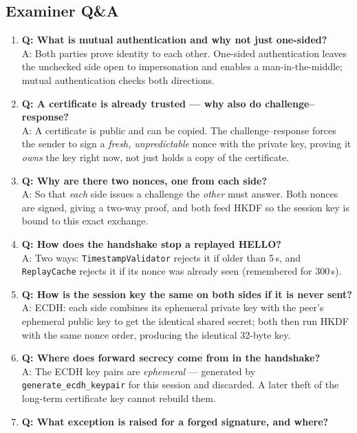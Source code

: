 \documentclass[11pt,a4paper]{report}
\begin{document}
\subsection{Examiner Q\&A}
\begin{enumerate}
  \item \textbf{Q: What is mutual authentication and why not just one-sided?}\\
        A: Both parties prove identity to each other. One-sided authentication
        leaves the unchecked side open to impersonation and enables a
        man-in-the-middle; mutual authentication checks both directions.
  \item \textbf{Q: A certificate is already trusted --- why also do
        challenge--response?}\\
        A: A certificate is public and can be copied. The challenge--response
        forces the sender to sign a \emph{fresh, unpredictable} nonce with the
        private key, proving it \emph{owns} the key right now, not just holds a
        copy of the certificate.
  \item \textbf{Q: Why are there two nonces, one from each side?}\\
        A: So that \emph{each} side issues a challenge the \emph{other} must
        answer. Both nonces are signed, giving a two-way proof, and both feed
        HKDF so the session key is bound to this exact exchange.
  \item \textbf{Q: How does the handshake stop a replayed HELLO?}\\
        A: Two ways: \texttt{TimestampValidator} rejects it if older than 5\,s,
        and \texttt{ReplayCache} rejects it if its nonce was already seen
        (remembered for 300\,s).
  \item \textbf{Q: How is the session key the same on both sides if it is never
        sent?}\\
        A: ECDH: each side combines its ephemeral private key with the peer's
        ephemeral public key to get the identical shared secret; both then run
        HKDF with the same nonce order, producing the identical 32-byte key.
  \item \textbf{Q: Where does forward secrecy come from in the handshake?}\\
        A: The ECDH key pairs are \emph{ephemeral} --- generated by
        \texttt{generate\_ecdh\_keypair} for this session and discarded.
        A later theft of the long-term certificate key cannot rebuild them.
  \item \textbf{Q: What exception is raised for a forged signature, and where?}\\

\end{enumerate}
\end{document}
